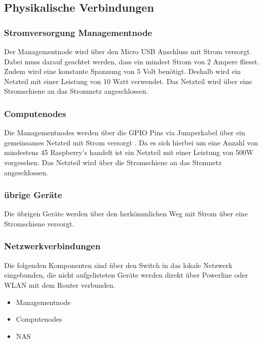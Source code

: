 \subsection{Physikalische Verbindungen}

\subsubsection{Stromversorgung Managementnode}
Der Managementnode wird über den Micro USB Anschluss mit Strom versorgt. Dabei muss darauf geachtet werden, dass ein mindest Strom von 2 Ampere fliesst. Zudem wird eine konstante Spannung von 5 Volt benötigt. Deshalb wird ein Netzteil mit einer Leistung von 10 Watt verwendet. Das Netzteil wird über eine Stromschiene an das Stromnetz angeschlossen.

\subsubsection{Computenodes}
Die Managementnodes werden über die GPIO Pins via Jumperkabel über ein gemeinsames Netzteil mit Strom versorgt . Da es sich hierbei um eine Anzahl von mindestens 45 Raspberry's handelt ist ein Netzteil mit einer Leistung von 500W vorgesehen. Das Netzteil wird über die Stromschiene an das Stomnetz angeschlossen.


\subsubsection{übrige Geräte}
Die übrigen Geräte werden über den herkömmlichen Weg mit Strom über eine Stromschiene versorgt.

\subsubsection{Netzwerkverbindungen}
Die folgenden Komponenten sind über den Switch in das lokale Netzwerk eingebunden, die nicht aufgelisteten Geräte werden direkt über Powerline oder WLAN mit dem Router verbunden.
\begin{itemize}
\item Managementnode
\item Computenodes
\item NAS
\end{itemize}


